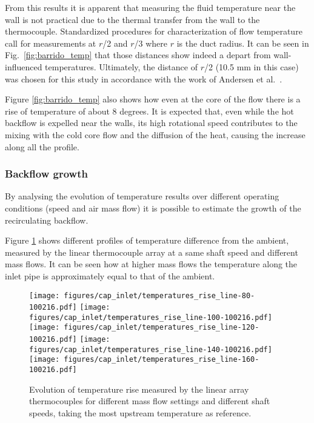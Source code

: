 From this results it is apparent that measuring the fluid temperature near the wall is not practical due to the thermal transfer from the wall to the thermocouple. Standardized procedures for characterization of flow temperature call for measurements at $r$/2 and $r$/3 where $r$ is the duct radius. It can be seen in Fig.~\ref{fig:barrido_temp} that those distances show indeed a depart from wall-influenced temperatures. Ultimately, the distance of $r$/2 (10.5 mm in this case) was chosen for this study in accordance with the work of Andersen et al.~\cite{andersen2009surge}.

Figure \ref{fig:barrido_temp} also shows how even at the core of the flow there is a rise of temperature of about 8 degrees. It is expected that, even while the hot backflow is expelled near the walls, its high rotational speed contributes to the mixing with the cold core flow and the diffusion of the heat, causing the increase along all the profile.

\subsubsection{Backflow growth}

By analysing the evolution of temperature results over different operating conditions (speed and air mass flow) it is possible to estimate the growth of the recirculating backflow.

Figure \ref{fig:temp_line_linear} shows different profiles of temperature difference from the ambient, measured by the linear thermocouple array at a same shaft speed and different mass flows. It can be seen how at higher mass flows the temperature along the inlet pipe is approximately equal to that of the ambient.

\begin{figure}[htb!]
\centering
\texttt{[image: figures/cap\_inlet/temperatures\_rise\_line-80-100216.pdf]}
\texttt{[image: figures/cap\_inlet/temperatures\_rise\_line-100-100216.pdf]}\\[4mm]
\texttt{[image: figures/cap\_inlet/temperatures\_rise\_line-120-100216.pdf]}
\texttt{[image: figures/cap\_inlet/temperatures\_rise\_line-140-100216.pdf]}\\[4mm]
\texttt{[image: figures/cap\_inlet/temperatures\_rise\_line-160-100216.pdf]}
\caption[Longitudinal temperature distributions]{Evolution of temperature rise measured by the linear array thermocouples for different mass flow settings and different shaft speeds, taking the most upstream temperature as reference.}
\label{fig:temp_line_linear}
\end{figure}


